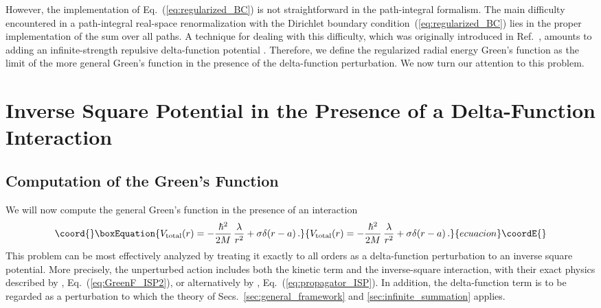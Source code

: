 \documentclass[a4paper,preprint,draft,showpacs,amsmath,amsfonts,amssymb,aps,prd]{revtex4}%
\begin{document}
However, the implementation of
Eq.~(\ref{eq:regularized_BC}) is not straightforward in the path-integral formalism. 
The main difficulty encountered in a path-integral real-space 
renormalization with the Dirichlet 
boundary condition~(\ref{eq:regularized_BC})
lies in the proper implementation of the sum over all paths.
A technique for dealing with this difficulty,
which was originally introduced in 
Ref.~\cite{gro:93}, amounts to adding an infinite-strength
repulsive delta-function potential \coordHE{}.
Therefore, we define the 
regularized radial energy Green's function 
\coordHE{}
as the limit
\myHighlight{$\sigma \rightarrow \infty$}\coordHE{} of the 
more general Green's function \coordHE{}
in the presence of the delta-function perturbation.
We now turn our attention to this problem.



\section{Inverse Square Potential in the Presence of a  
Delta-Function Interaction}
\label{sec:ISP+delta}


\subsection{Computation of the Green's Function}
\label{sec:ISP+delta_GF_computation}


We will now compute the
general Green's function \coordHE{}
in the presence of an interaction
\begin{equation}\coord{}\boxEquation{
V_{\rm total}(r)=
-\frac{ \hbar^{2}}{2M}
 \,  \frac{\lambda}{r^{2}}
+ \sigma \delta (r-a)
\,  .
\label{eq:ISP+delta}
}{
V_{\rm total}(r)=
-\frac{ \hbar^{2}}{2M}
 \,  \frac{\lambda}{r^{2}}
+ \sigma \delta (r-a)
\,  .
}{ecuacion}\coordE{}\end{equation}
This problem can be most effectively analyzed by 
treating it exactly to all orders
as a delta-function perturbation 
to an inverse square potential.
More precisely,
the unperturbed action
\coordHE{}  includes both the kinetic term and the inverse-square interaction,
with their exact physics described by 
\coordHE{}, 
Eq.~(\ref{eq:GreenF_ISP2}),
or alternatively by 
\coordHE{}, Eq.~(\ref{eq:propagator_ISP}).
In addition, the 
delta-function term 
\coordHE{}
is to be regarded
as a perturbation to which the theory of Secs.~\ref{sec:general_framework}
and \ref{sec:infinite_summation}
applies.
 
\end{document}
